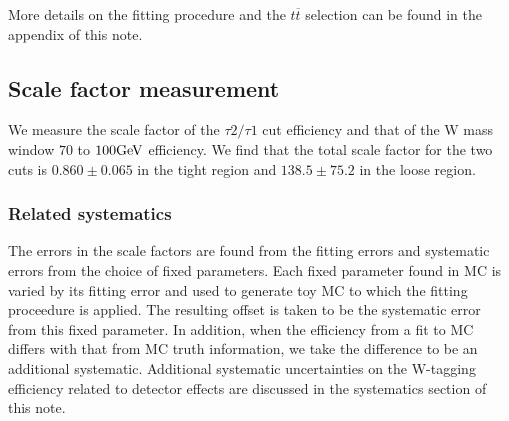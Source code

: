 More details on the fitting procedure and the $t\overline{t}$ selection can be found in the appendix of this note.

\subsection{Scale factor measurement}
We measure the scale factor of the $\tau 2/\tau 1$ cut efficiency and that of the W mass window $70$ to $100\mathrm{GeV}$ efficiency. We find that the total scale factor for the two cuts is $0.860 \pm 0.065$ in the tight region and $138.5 \pm 75.2$ in the loose region.

\subsubsection{Related systematics}
The errors in the scale factors are found from the fitting errors and systematic errors from the choice of fixed parameters. Each fixed parameter found in MC is varied by its fitting error and used to generate toy MC to which the fitting proceedure is applied. The resulting offset is taken to be the systematic error from this fixed parameter. In addition, when the efficiency from a fit to MC differs with that from MC truth information, we take the difference to be an additional systematic. 
Additional systematic uncertainties on the W-tagging efficiency related to detector effects are discussed in the systematics section of this note.
\clearpage
